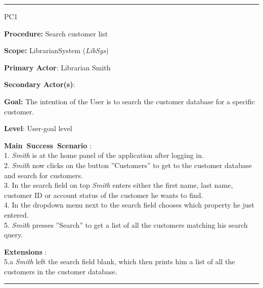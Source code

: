 \vspace{0.5cm}
\hrule
\begin{lyxlist}{PC1}
\small{
\item [\textbf{Procedure:}] Search customer list
\item [\textbf{Scope:}] LibrarianSystem (\emph{LibSys})
\item [\textbf{Primary Actor}:] Librarian Smith
\item [\textbf{Secondary Actor(s)}:] 
\item [\textbf{Goal:}] The intention of the User is to search the customer
database for a specific customer.
\item [\textbf{Level}:] User-goal level
\item [\textbf{Main~Success~Scenario}]:\\
1. \emph{Smith} is at the home panel of the application after logging in.\\
2. \emph{Smith} now clicks on the button ''Customers'' to get to the customer
database and search for customers.\\
3. In the search field on top \emph{Smith} enters either the first name, last
name, customer ID or account status of the customer he wants to find.\\
4. In the dropdown menu next to the search field  chooses which
property he just entered.\\
5. \emph{Smith} presses ''Search'' to get a list of all the customers matching
his search query.\\


\item [\textbf{Extensions}]:\\
5.a \emph{Smith} left the search field blank, which then prints him a list of
all the customers in the customer database.\\
}

\end{lyxlist}
\hrule


